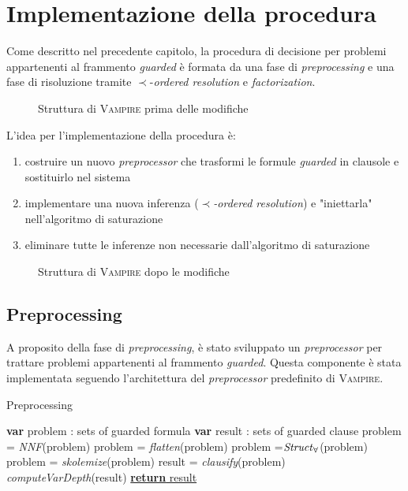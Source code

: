\chapter{Implementazione della procedura}
Come descritto nel precedente capitolo, la procedura di decisione per problemi
appartenenti al frammento \emph{guarded} è formata da una fase di \emph{preprocessing} e 
una fase di risoluzione tramite $\prec$-\emph{ordered resolution} e \emph{factorization}. 
\begin{figure}[H]
    \caption{Struttura di \textsc{Vampire} prima delle modifiche}
\end{figure}
L'idea per l'implementazione della procedura è:
\begin{enumerate}
    \item costruire un nuovo \emph{preprocessor} che trasformi le formule \emph{guarded} in clausole e sostituirlo nel sistema
    \item implementare una nuova inferenza ($\prec$\emph{-ordered resolution}) e "iniettarla" nell'algoritmo di saturazione
    \item eliminare tutte le inferenze non necessarie dall'algoritmo di saturazione 
\end{enumerate}
\begin{figure}[H]
    \caption{Struttura di \textsc{Vampire} dopo le modifiche}
\end{figure}
\section{Preprocessing}
A proposito della fase di \emph{preprocessing}, è stato sviluppato un \emph{preprocessor} per trattare problemi 
appartenenti al frammento \emph{guarded}. Questa componente è stata implementata seguendo l'architettura 
del \emph{preprocessor} predefinito di \textsc{Vampire}.
\begin{algorithm}
    \caption{Preprocessing}
    \begin{algorithmic}
        \State \textbf{var} problem : sets of guarded formula
        \State \textbf{var} result : sets of guarded clause 
        \State problem = \emph{NNF}(problem)
        \State problem = \emph{flatten}(problem)
        \State problem =$\text{\emph{Struct}}_\forall$(problem)
        \State problem = \emph{skolemize}(problem)
        \State result = \emph{clausify}(problem)
        \State \emph{computeVarDepth}(result)
        \State \underline{\textbf{return} result}
    \end{algorithmic}
\end{algorithm}

